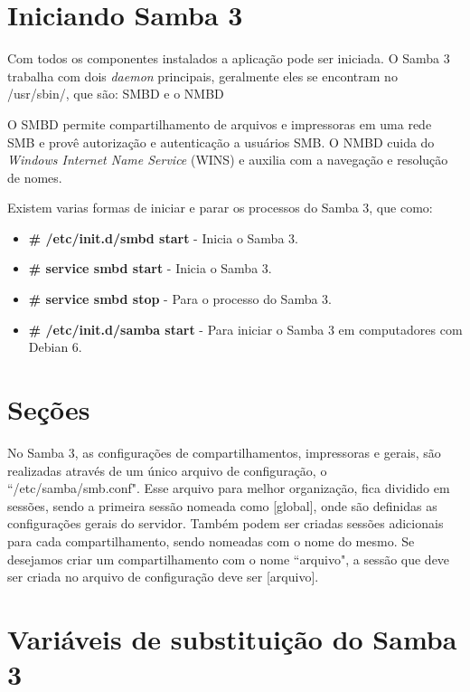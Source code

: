\section{Iniciando Samba 3}

Com todos os componentes instalados a aplicação pode ser iniciada. O Samba 3 trabalha com dois \textit{daemon} principais, geralmente eles se encontram no /usr/sbin/,  que são: SMBD e o NMBD

O SMBD permite compartilhamento de arquivos e impressoras em uma rede SMB e provê autorização e autenticação a usuários SMB. O NMBD cuida do \textit{Windows Internet Name Service} (WINS) e auxilia com a navegação e resolução de nomes.\cite{SAMBA}

Existem varias formas de iniciar e parar os processos do Samba 3, que como:
\begin{itemize}
	\item \textbf{\# /etc/init.d/smbd start} - Inicia o Samba 3. 
	\item \textbf{\# service smbd start} - Inicia o Samba 3.
	\item \textbf{\# service smbd stop} - Para o processo do Samba 3.
	\item \textbf{\# /etc/init.d/samba start} - Para iniciar o Samba 3 em computadores com Debian 6.
\end{itemize}

\section{Seções}

No Samba 3, as configurações de compartilhamentos, impressoras e gerais, são realizadas através de um único arquivo de configuração, o ``/etc/samba/smb.conf". Esse arquivo para melhor organização, fica dividido em sessões, sendo a primeira sessão nomeada como [global], onde são definidas as configurações gerais do servidor. Também podem ser criadas sessões adicionais para cada compartilhamento, sendo nomeadas com o nome do mesmo. Se desejamos criar um compartilhamento com o nome ``arquivo", a sessão que deve ser criada no arquivo de configuração deve ser [arquivo].

\section{Variáveis de substituição do Samba 3}

